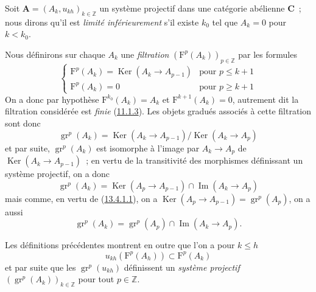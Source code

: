 \begin{env}[13.4.1]
\label{0.13.4.1-fr}
Soit $\mathbf A=(A_k,u_{kh})_{k\in\mathbb Z}$ un système projectif dans une
catégorie abélienne $\boldsymbol{C}$~; nous dirons qu'il est \emph{limité inférieurement}
s'il existe $k_0$ tel que $A_k=0$ pour $k<k_0$.

Nous définirons sur chaque
$A_k$ une \emph{filtration} $(\mathrm F^p(A_k))_{p\in\mathbb Z}$ par les
formules
\begin{equation}
\label{0.13.4.1.1-fr}
\tag{13.4.1.1}
\begin{cases}
\mathrm F^p(A_k)=\operatorname{Ker}(A_k\longrightarrow A_{p-1})&\text{pour }p\leq k+1\\
\mathrm F^p(A_k)=0&\text{pour }p\geq k+1
\end{cases}
\end{equation}
On a donc par hypothèse
$\mathrm F^{k_0}(A_k)=A_k$ et $\mathrm F^{k+1}(A_k)=0$, autrement dit la
filtration considérée est \emph{finie}
(\hyperref[0.11.1.3-fr]{11.1.3}). Les objets gradués associés à cette
filtration sont donc
\[
\operatorname{gr}^p(A_k)=
\operatorname{Ker}(A_k\longrightarrow A_{p-1})
/\operatorname{Ker}(A_k\longrightarrow A_p)
\]
et par suite, $\operatorname{gr}^p(A_k)$ est isomorphe à l'image par
$A_k\to A_p$ de $\operatorname{Ker}(A_k\to A_{p-1})$~; en vertu de la
transitivité des morphismes définissant un système projectif, on a donc
\begin{equation}
\label{0.13.4.1.2-fr}
\tag{13.4.1.2}
\operatorname{gr}^p(A_k)=
\operatorname{Ker}(A_p\longrightarrow A_{p-1})
\cap\operatorname{Im}(A_k\longrightarrow A_p)
\end{equation}
mais comme, en vertu de
(\hyperref[0.13.4.1.1-fr]{13.4.1.1}), on a
$\operatorname{Ker}(A_p\to A_{p-1})=\operatorname{gr}^p(A_p)$, on a aussi
\begin{equation}
\label{0.13.4.1.3-fr}
\tag{13.4.1.3}
\operatorname{gr}^p(A_k)=
\operatorname{gr}^p(A_p)\cap\operatorname{Im}(A_k\longrightarrow A_p).
\end{equation}

Les définitions précédentes montrent en outre que l'on a pour $k\leq h$
\[
u_{kh}(\mathrm F^p(A_h))\subset\mathrm F^p(A_k)
\]
et par suite que les $\operatorname{gr}^p(u_{kh})$ définissent un
\emph{système projectif}
$(\operatorname{gr}^p(A_k))_{k\in\mathbb Z}$ pour tout $p\in\mathbb Z$.
\end{env}

